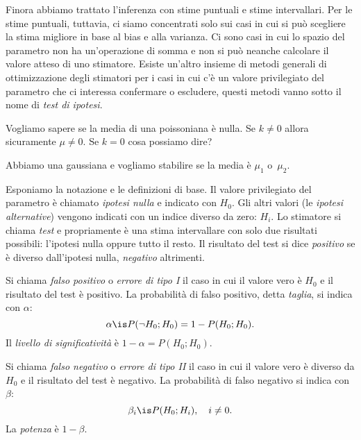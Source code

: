 

Finora abbiamo trattato l'inferenza con stime puntuali e stime intervallari.
Per le stime puntuali, tuttavia,
ci siamo concentrati solo sui casi in cui si può scegliere la stima migliore in base al bias e alla varianza.
Ci sono casi in cui lo spazio del parametro non ha un'operazione di somma
e non si può neanche calcolare il valore atteso di uno stimatore.
Esiste un'altro insieme di metodi generali di ottimizzazione degli stimatori
per i casi in cui c'è un valore privilegiato del parametro che ci interessa confermare o escludere,
questi metodi vanno sotto il nome di \emph{test di ipotesi}.

\begin{example}
	Vogliamo sapere se la media di una poissoniana è nulla.
	Se $k\neq 0$ allora sicuramente $\mu\neq 0$.
	Se $k=0$ cosa possiamo dire?
\end{example}

\begin{example}
	Abbiamo una gaussiana e vogliamo stabilire se la media è $\mu_1$ o~$\mu_2$.
\end{example}

Esponiamo la notazione e le definizioni di base.
Il valore privilegiato del parametro è chiamato \emph{ipotesi nulla} e indicato con $H_0$.
Gli altri valori (le \emph{ipotesi alternative}) vengono indicati con un indice diverso da zero: $H_i$.
Lo stimatore si chiama \emph{test} e propriamente è una stima intervallare
con solo due risultati possibili: l'ipotesi nulla oppure tutto il resto.
Il risultato del test si dice \emph{positivo} se è diverso dall'ipotesi nulla,
\emph{negativo} altrimenti.

\begin{definition}
	Si chiama \emph{falso positivo} o \emph{errore di tipo I}
	il caso in cui il valore vero è $H_0$ e il risultato del test è positivo.
	La probabilità di falso positivo, detta \emph{taglia}, si indica con $\alpha$:
	\begin{equation*}
		\alpha
		\is P(\neg H_0;H_0) = 1 - P(H_0;H_0).
	\end{equation*}
	Il \emph{livello di significatività} è $1-\alpha = P(H_0;H_0)$.
\end{definition}

\begin{definition}
	Si chiama \emph{falso negativo} o \emph{errore di tipo II}
	il caso in cui il valore vero è diverso da $H_0$ e il risultato del test è negativo.
	La probabilità di falso negativo si indica con $\beta$:
	\begin{equation*}
		\beta_i
		\is P(H_0;H_i), \quad i \neq 0.
	\end{equation*}
	La \emph{potenza} è $1-\beta$.
\end{definition}

